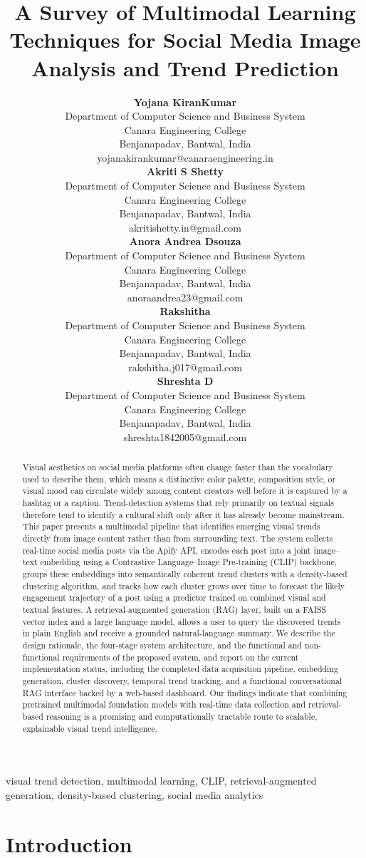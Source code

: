 \documentclass[conference]{IEEEtran}
\title{A Survey of Multimodal Learning Techniques for Social Media Image
Analysis and Trend Prediction}
\author{%
\begin{minipage}{\textwidth}
\centering


\begin{minipage}[t]{0.30\textwidth}
\centering
\textbf{Yojana KiranKumar}\\
Department of Computer Science and Business System\\
Canara Engineering College\\
Benjanapadav, Bantwal, India\\
{\footnotesize yojanakirankumar@canaraengineering.in}
\end{minipage}
\hfill
\begin{minipage}[t]{0.30\textwidth}
\centering
\textbf{Akriti S Shetty}\\
Department of Computer Science and Business System\\
Canara Engineering College\\
Benjanapadav, Bantwal, India\\
{\footnotesize akritishetty.in@gmail.com}
\end{minipage}
\hfill
\begin{minipage}[t]{0.30\textwidth}
\centering
\textbf{Anora Andrea Dsouza}\\
Department of Computer Science and Business System\\
Canara Engineering College\\
Benjanapadav, Bantwal, India\\
{\footnotesize anoraandrea23@gmail.com}
\end{minipage}

\vspace{15pt}


\begin{minipage}[t]{0.30\textwidth}
\centering
\textbf{Rakshitha}\\
Department of Computer Science and Business System\\
Canara Engineering College\\
Benjanapadav, Bantwal, India\\
{\footnotesize rakshitha.j017@gmail.com}
\end{minipage}
\hspace{0.10\textwidth}
\begin{minipage}[t]{0.30\textwidth}
\centering
\textbf{Shreshta D}\\
Department of Computer Science and Business System\\
Canara Engineering College\\
Benjanapadav, Bantwal, India\\
{\footnotesize shreshta1842005@gmail.com}
\end{minipage}

\end{minipage}
}
\begin{document}
\maketitle

\begin{abstract}
Visual aesthetics on social media platforms often change faster than the vocabulary used to describe them, which means a distinctive color palette, composition style, or visual mood can circulate widely among content creators well before it is captured by a hashtag or a caption. Trend-detection systems that rely primarily on textual signals therefore tend to identify a cultural shift only after it has already become mainstream. This paper presents a multimodal pipeline that identifies emerging visual trends directly from image content rather than from surrounding text. The system collects real-time social media posts via the Apify API, encodes each post into a joint image--text embedding using a Contrastive Language--Image Pre-training (CLIP) backbone, groups these embeddings into semantically coherent trend clusters with a density-based clustering algorithm, and tracks how each cluster grows over time to forecast the likely engagement trajectory of a post using a predictor trained on combined visual and textual features. A retrieval-augmented generation (RAG) layer, built on a FAISS vector index and a large language model, allows a user to query the discovered trends in plain English and receive a grounded natural-language summary. We describe the design rationale, the four-stage system architecture, and the functional and non-functional requirements of the proposed system, and report on the current implementation status, including the completed data acquisition pipeline, embedding generation, cluster discovery, temporal trend tracking, and a functional conversational RAG interface backed by a web-based dashboard. Our findings indicate that combining pretrained multimodal foundation models with real-time data collection and retrieval-based reasoning is a promising and computationally tractable route to scalable, explainable visual trend intelligence.
\end{abstract}

\begin{IEEEkeywords}
visual trend detection, multimodal learning, CLIP, retrieval-augmented generation, density-based clustering, social media analytics
\end{IEEEkeywords}

\section{Introduction}
\end{document}
